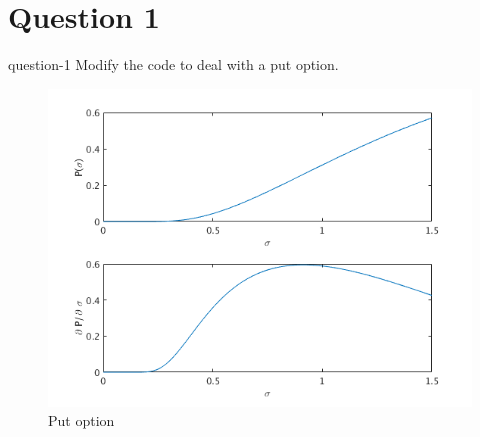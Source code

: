 \section{Question 1}
\begin{statebox}{}{question-1}
    Modify the code to deal with a put option.
\end{statebox}
\begin{figure}[H]
    \centering
    \includegraphics[width=.7\textwidth]{figures/2019-12-04-put.png}
    \caption{Put option}\label{F:1}
\end{figure}


